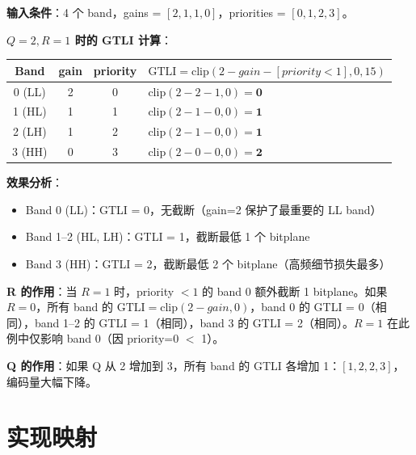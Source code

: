\begin{examplebox}[title={Per-Band GTLI 表计算示例}]

\textbf{输入条件}：4 个 band，gains = $[2, 1, 1, 0]$，priorities = $[0, 1, 2, 3]$。

\medskip
\textbf{$Q=2, R=1$ 时的 GTLI 计算}：

\begin{tabular}{@{}cccl@{}}
\toprule
Band & gain & priority & $\mathrm{GTLI} = \mathrm{clip}(2 - \mathit{gain} - [\mathit{priority} < 1], 0, 15)$ \\
\midrule
0 (LL) & 2 & 0 & $\mathrm{clip}(2-2-1, 0) = \mathbf{0}$ \\
1 (HL) & 1 & 1 & $\mathrm{clip}(2-1-0, 0) = \mathbf{1}$ \\
2 (LH) & 1 & 2 & $\mathrm{clip}(2-1-0, 0) = \mathbf{1}$ \\
3 (HH) & 0 & 3 & $\mathrm{clip}(2-0-0, 0) = \mathbf{2}$ \\
\bottomrule
\end{tabular}

\medskip
\textbf{效果分析}：
\begin{itemize}
  \item Band 0 (LL)：GTLI = 0，无截断（gain=2 保护了最重要的 LL band）
  \item Band 1--2 (HL, LH)：GTLI = 1，截断最低 1 个 bitplane
  \item Band 3 (HH)：GTLI = 2，截断最低 2 个 bitplane（高频细节损失最多）
\end{itemize}

\textbf{R 的作用}：当 $R=1$ 时，priority $< 1$ 的 band 0 额外截断 1 bitplane。如果 $R=0$，所有 band 的 $\mathrm{GTLI} = \mathrm{clip}(2-\mathit{gain}, 0)$，band 0 的 GTLI = 0（相同），band 1--2 的 GTLI = 1（相同），band 3 的 GTLI = 2（相同）。$R=1$ 在此例中仅影响 band 0（因 priority=0 $<$ 1）。

\textbf{Q 的作用}：如果 Q 从 2 增加到 3，所有 band 的 GTLI 各增加 1：$[1, 2, 2, 3]$，编码量大幅下降。
\end{examplebox}

\section{实现映射}

